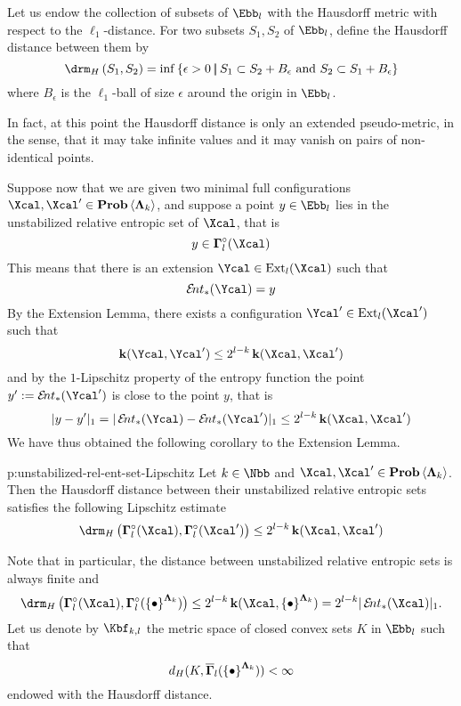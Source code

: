   Let us endow the collection of subsets of $\Ebb_{l}$ with the
  Hausdorff metric with respect to the $\ell_1$-distance. For two
  subsets $S_1, S_2$ of $\Ebb_{l}$, define the Hausdorff distance
  between them by
  \[
  \d_H \left( S_1, S_2 \right) 
  = 
  \inf\set{ \epsilon > 0 
            \st 
            S_1 \subset S_2 + B_\epsilon \text{ and } S_2 \subset
            S_1 + B_\epsilon 
          }
  \]
  where $B_\epsilon$ is the $\ell_1$-ball of size $\epsilon$ around
  the origin in $\Ebb_l$.

  In fact, at this point the Hausdorff distance is only an extended
  pseudo-metric, in the sense, that it may take infinite values and it
  may vanish on pairs of non-identical points.

  Suppose now that we are given two minimal full configurations
  $\Xcal, \Xcal' \in \prob\<\Lambdabf_k>$, and suppose a point $y \in
  \Ebb_l$ lies in the unstabilized relative
  entropic set of $\Xcal$, that is
  \[
  y \in \res_l(\Xcal )
  \]
  This means that there is an extension $\Ycal \in \Ext_l(\Xcal)$ such that 
  \[
  \ent_*(\Ycal) = y
  \]
  By the Extension Lemma, there exists a configuration $\Ycal' \in
  \Ext_l(\Xcal')$ such that
  \[
  \ikd(\Ycal, \Ycal') 
  \leq 
  2^{l-k} \ikd (\Xcal, \Xcal')
  \]
  and by the $1$-Lipschitz property of the entropy function the point
  $y' := \ent_*(\Ycal')$ is close to the point $y$, that is
  \[
  | y - y' |_{1} 
  = 
  | \ent_*(\Ycal) - \ent_*(\Ycal')|_{1} \leq 2^{l-k} \ikd(\Xcal, \Xcal')
  \]
  We have thus obtained the following corollary to the Extension Lemma.

  \begin{corollary}{p:unstabilized-rel-ent-set-Lipschitz}
    Let $k \in \Nbb$ and $\Xcal, \Xcal' \in \prob\<\Lambdabf_k>$.
    Then the Hausdorff distance between their unstabilized relative
    entropic sets satisfies the following Lipschitz estimate
    \[
    \d_H\big( \res_{l}(\Xcal), \res_l(\Xcal') \big) 
    \leq 2^{l-k} \ikd(\Xcal, \Xcal')
    \]
  \end{corollary}


  Note that in particular, the distance between unstabilized relative
  entropic sets is always finite and
  \[
  \d_H\big( 
        \res_l(\Xcal), 
        \res_l(\set{\bullet}^{\Lambdabf_{k}} )
      \big) 
  \leq 
  2^{l-k} \ikd(\Xcal, \set{\bullet}^{\Lambdabf_{k}}) 
  = 
  2^{l-k}|\ent_*(\Xcal)|_1.
  \]
  Let us denote by $\convconend$ the metric space of closed convex
  sets $K$ in $\Ebb_{l}$ such that
  \[
  d_H( K, \overline{\bm\Gamma}_l(\left\{\bullet\right\}^{\bm\Lambda_{k}})  ) < \infty
  \]
  endowed with the Hausdorff distance.

